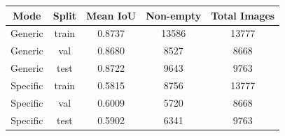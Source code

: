 \begin{tabular}{ccccc}
\hline
Mode & Split & Mean IoU & Non-empty & Total Images \\
\hline
Generic & train & 0.8737 & 13586 & 13777 \\
Generic & val & 0.8680 & 8527 & 8668 \\
Generic & test & 0.8722 & 9643 & 9763 \\
Specific & train & 0.5815 & 8756 & 13777 \\
Specific & val & 0.6009 & 5720 & 8668 \\
Specific & test & 0.5902 & 6341 & 9763 \\
\hline
\end{tabular}
